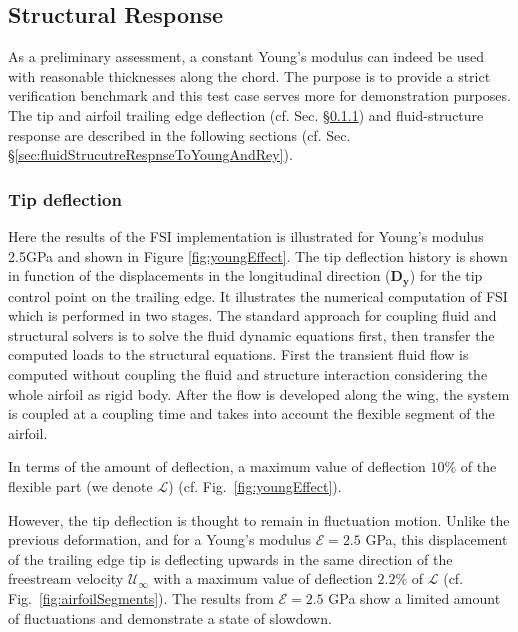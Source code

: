 \subsection{Structural Response}
\label{sec:structure}


As a preliminary assessment, a constant Young's modulus can indeed be used with reasonable thicknesses along the chord.
%
The purpose is to provide a strict verification benchmark and this test case serves more for demonstration purposes.
%
The tip and airfoil trailing edge deflection (cf. Sec. \S\ref{sec:deflection}) and fluid-structure response are described in the following sections (cf. Sec. \S\ref{sec:fluidStrucutreRespnseToYoungAndRey}).

\subsubsection{Tip deflection}
\label{sec:deflection}

Here the results of the FSI implementation is illustrated for Young's modulus 2.5GPa and shown in Figure \ref{fig:youngEffect}.
%
The tip deflection history is shown in function of the displacements in the longitudinal direction ($\boldsymbol{D_y}$) for the tip control point on the trailing edge.
%
It illustrates the numerical computation of FSI which is performed in two stages.
%
The standard approach for coupling fluid and structural solvers is to solve the fluid dynamic equations first, then transfer the computed loads to the structural equations.
%
First the transient fluid flow is computed without coupling the fluid and structure interaction considering the whole airfoil as rigid body.
%
After the flow is developed along the wing, the system is coupled at a coupling time and takes into account the flexible segment of the airfoil.

In terms of the amount of deflection, a maximum value of deflection $10\%$ of the flexible part (we denote $\mathcal{L}$) (cf. Fig.~\ref{fig:youngEffect}).
%

However, the tip deflection is thought to remain in fluctuation motion.
%
Unlike the previous deformation, and for a Young's modulus $\mathcal{E}=2.5$ GPa, this displacement of the trailing edge tip is deflecting upwards in the same direction of the freestream velocity $\mathcal{U}_\infty$ with a maximum value of deflection $2.2\%$ of $\mathcal{L}$ (cf. Fig.~\ref{fig:airfoilSegments}).
%
The results from $\mathcal{E}=2.5$ GPa show a limited amount of fluctuations and demonstrate a state of slowdown. 


